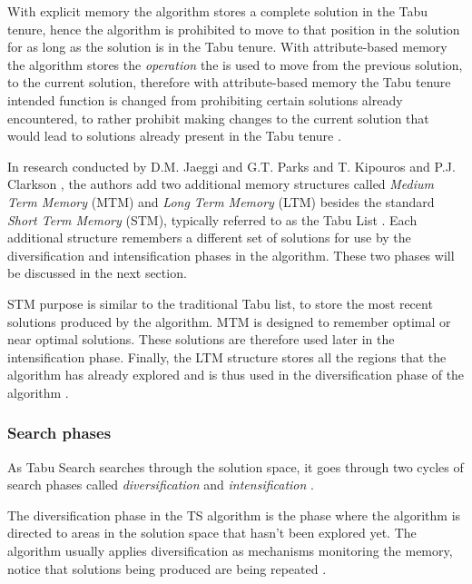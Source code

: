 With explicit memory the algorithm stores a complete solution in the Tabu tenure, hence the algorithm is prohibited to move to that position in the solution for as long as the solution is in the Tabu tenure\cite{TabuBiddingStrats,TabuFormGames}. With attribute-based memory the algorithm stores the \emph{operation} the is used to move from the previous solution, to the current solution\cite{TabuBiddingStrats,TabuFormGames}, therefore with attribute-based memory the Tabu tenure intended function is changed from prohibiting certain solutions already encountered, to rather prohibit making changes to the current solution that would lead to solutions already present in the Tabu tenure \cite{TabuBiddingStrats,TabuFormGames}.

In research conducted by D.M. Jaeggi and G.T. Parks and T. Kipouros and P.J. Clarkson \cite{MultiObjTabu}, the authors add two additional memory structures called \emph{Medium Term Memory} (MTM) and \emph{Long Term Memory} (LTM) besides the standard \emph{Short Term Memory} (STM), typically referred to as the Tabu List \cite{MultiObjTabu}. Each additional structure remembers a different set of solutions for use by the diversification and intensification phases in the algorithm. These two phases will be discussed in the next section.

STM purpose is similar to the traditional Tabu list, to store the most recent solutions produced by the algorithm. MTM is designed to remember optimal or near optimal solutions. These solutions are therefore used later in the intensification phase. Finally, the LTM structure stores all the regions that the algorithm has already explored and is thus used in the diversification phase of the algorithm \cite{MultiObjTabu}.

\subsubsection{Search phases}
As Tabu Search searches through the solution space, it goes through two cycles of search phases called \emph{diversification} and \emph{intensification} \cite{TabuParameterization,TabuCrewSchedulingProblem,NonlinearGlobalTabu,SelfControllingReactiveTabu}.

The diversification phase in the TS algorithm is the phase where the algorithm is directed to areas in the solution space that hasn't been explored yet. The algorithm usually applies diversification as mechanisms monitoring the memory, notice that solutions being produced are being repeated \cite{ReactiveTabuVHR,SelfControllingReactiveTabu}. 

